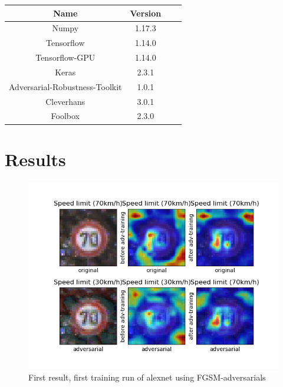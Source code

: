 \documentclass[draft,final]{vutinfth} %
\begin{document}
\begin{table}[h]
  \centering
  \begin{tabular}{cccc}
    \toprule
Name                                    & Version   \\
    \midrule
    Numpy                               & 1.17.3    \\
    Tensorflow                          & 1.14.0    \\
    Tensorflow-GPU                      & 1.14.0    \\
    Keras                               & 2.3.1     \\
    Adversarial-Robustness-Toolkit      & 1.0.1     \\
    Cleverhans                          & 3.0.1     \\
    Foolbox                             & 2.3.0     \\
    
    \bottomrule
  \end{tabular}
\end{table}

\chapter{Results}

\begin{figure}[h]
    \centering
    \includegraphics[scale=0.5]{graphics/Results/3.png}
    \caption{First result, first training run of alexnet using FGSM-adversarials}
    \label{fig:results} %
\end{figure}
\end{document}
